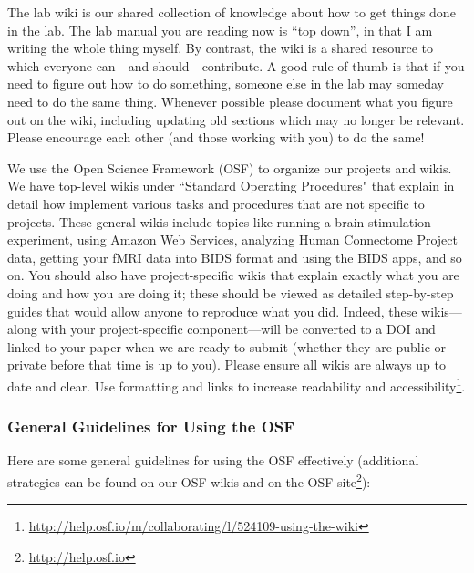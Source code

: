 \documentclass[letterpaper,12pt,oneside]{memoir}
\begin{document}
The lab wiki is our shared collection of knowledge about how to get things done in the lab. The lab manual you are reading now is ``top down'', in that I am writing the whole thing myself. By contrast, the wiki is a shared resource to which everyone can---and should---contribute. A good rule of thumb is that if you need to figure out how to do something, someone else in the lab may someday need to do the same thing. Whenever possible please document what you figure out on the wiki, including updating old sections which may no longer be relevant. Please encourage each other (and those working with you) to do the same!

We use the Open Science Framework (OSF) to organize our projects and wikis. We have top-level wikis under ``Standard Operating Procedures" that explain in detail how implement various tasks and procedures that are not specific to projects. These general wikis include topics like running a brain stimulation experiment, using Amazon Web Services, analyzing Human Connectome Project data, getting your fMRI data into BIDS format and using the BIDS apps, and so on. You should also have project-specific wikis that explain exactly what you are doing and how you are doing it; these should be viewed as detailed step-by-step guides that would allow anyone to reproduce what you did. Indeed, these wikis---along with your project-specific component---will be converted to a DOI and linked to your paper when we are ready to submit (whether they are public or private before that time is up to you). Please ensure all wikis are always up to date and clear. Use formatting and links to increase readability and accessibility\footnote{\url{http://help.osf.io/m/collaborating/l/524109-using-the-wiki}}.

\subsubsection{General Guidelines for Using the OSF}

Here are some general guidelines for using the OSF effectively (additional strategies can be found on our OSF wikis and on the OSF site\footnote{\url{http://help.osf.io}}):
\end{document}
